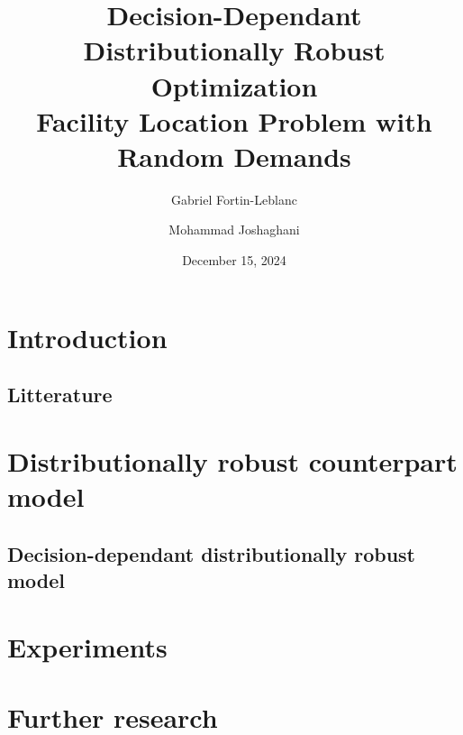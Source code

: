 \documentclass[12pt, letterpaper]{article}
\title{
	Decision-Dependant Distributionally Robust Optimization \\
	\large Facility Location Problem with Random Demands
}
\author[1]{Gabriel Fortin-Leblanc}
\author[2]{Mohammad Joshaghani}
\affil[1]{Université de Montréal}
\affil[2]{Université du Québec à Montréal}
\date{December 15, 2024}
\begin{document}
	\maketitle
	\tableofcontents
	\newpage
	
	\section*{Introduction}
	
	\subsection*{Litterature}
	
	\section{Distributionally robust counterpart model}
	
	\subsection{Decision-dependant distributionally robust model}
	
	\section{Experiments}
	
	\section{Further research}
	
	
	
\end{document}
